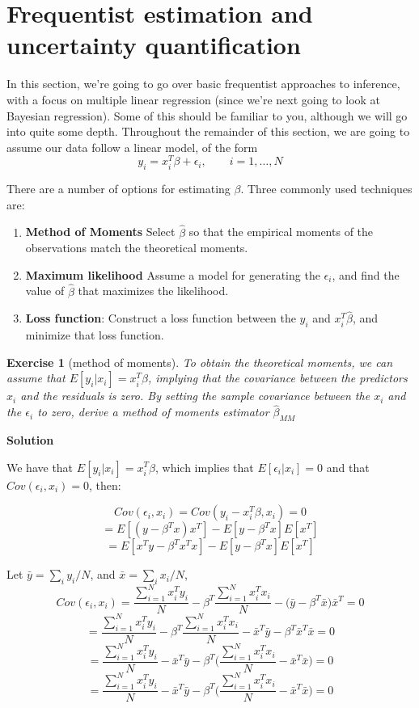 \documentclass[twoside]{article}
\newcounter{lecnum}
\newtheorem{exercise}{Exercise}[lecnum]
\begin{document}
\newpage 


\section{Frequentist estimation and uncertainty quantification}

In this section, we're going to go over basic frequentist approaches to inference, with a focus on multiple linear regression (since we're next going to look at Bayesian regression). Some of this should be familiar to you, although we will go into quite some depth. Throughout the remainder of this section, we are going to assume our data follow a linear model, of the form
$$y_i = x_i^T\beta + \epsilon_i,\qquad i=1,\dots,N$$

There are a number of options for estimating $\beta$. Three commonly used techniques are:
\begin{enumerate}
\item \textbf{Method of Moments} Select $\hat{\beta}$ so that the empirical moments of the observations match the theoretical moments.
\item \textbf{Maximum likelihood} Assume a model for generating the $\epsilon_i$, and find the value of $\hat{\beta}$ that maximizes the likelihood.
\item \textbf{Loss function}: Construct a loss function between the $y_i$ and $x_i^T\hat{\beta}$, and minimize that loss function.
\end{enumerate}

\begin{exercise}[method of moments]
  To obtain the theoretical moments, we can assume that $E[y_i|x_i] = x_i^T\beta$, implying that the covariance between the predictors $x_i$ and the residuals is zero. By setting the sample covariance between the $x_i$ and the $\epsilon_i$ to zero, derive a method of moments estimator $\hat{\beta}_{MM}$
\end{exercise}

\color{blue}
\textbf{Solution}

 We have that $E[y_i|x_i] = x_i^T\beta$, which implies that  $E[\epsilon_i|x_i] = 0$ and that $Cov(\epsilon_i,x_i)=0$, then:
 
 $$Cov(\epsilon_i,x_i)= Cov(y_i-x_i^T\beta, x_i)= 0$$
 $$ =  E[(y-\beta^Tx)x^T]-E[y-\beta^Tx] E[x^T] $$ 
 $$ = E[x^Ty-\beta^Tx^Tx]-E[y-\beta^Tx]E[x^T] $$
 
Let $\bar{y} = \sum_i y_i/N$, and $\bar{x} = \sum_i x_i/N$,
$$ Cov(\epsilon_i,x_i) = \frac{\sum_{i=1}^{N} x_i^Ty_i}{N} - \beta^T\frac{\sum_{i=1}^{N} x_i^Tx_i}{N}- \bigg(\bar{y} -  \beta^T \bar{x} \bigg)\bar{x}^T =0$$
$$ = \frac{\sum_{i=1}^{N} x_i^Ty_i}{N} - \beta^T\frac{\sum_{i=1}^{N} x_i^Tx_i}{N}- \bar{x}^T\bar{y} - \beta^T \bar{x}^T \bar{x} =0$$
$$  = \frac{\sum_{i=1}^{N} x_i^Ty_i}{N} - \bar{x}^T\bar{y} - \beta^T\bigg(  \frac{\sum_{i=1}^{N} x_i^Tx_i}{N} - \bar{x}^T \bar{x}  \bigg)=0 $$
$$  = \frac{\sum_{i=1}^{N} x_i^Ty_i}{N} - \bar{x}^T\bar{y} - \beta^T\bigg(  \frac{\sum_{i=1}^{N} x_i^Tx_i}{N} -  \bar{x}^T \bar{x} \bigg)=0 $$
\end{document}
